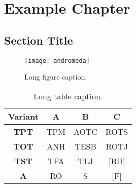 \chapter{Example Chapter}

\section{Section Title}
\lipsum

\begin{figure}
  \texttt{[image: andromeda]}
  \caption[Short figure caption]{
    Long figure caption.
  }
\end{figure}

\begin{table}
  \centering
  \caption[Short table caption]{
    Long table caption.
  }
  \begin{tabular}{cccc}
  	\hline
    Variant & \bf A & \bf B & \bf C \\
    \hline
    \bf TPT & TPM   & AOTC  & ROTS \\
    \bf TOT & ANH   & TESB  & ROTJ \\
    \bf TST & TFA   & TLJ   & [BD] \\
    \hline
    \bf A   & RO    & S     & [F]  \\
    \hline
  \end{tabular}
\end{table}
